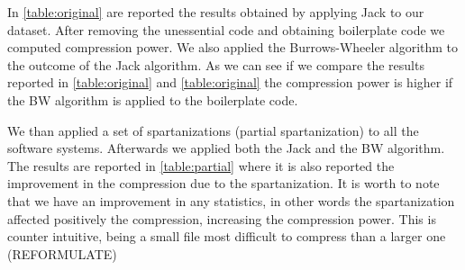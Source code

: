 In \cref{table:original} are reported the results obtained by applying Jack to
our dataset. After removing the unessential code and obtaining boilerplate
code we computed compression power. We also applied the Burrows-Wheeler
algorithm to the outcome of the Jack algorithm. As we can see if we compare
the results reported in \cref{table:original} and \cref{table:original} the
compression power is higher if the BW algorithm is applied to the boilerplate
code.

\begin{table}
  \label{table:original}
  \caption{The results of the compression using the Jack algorithm alone and both Jack and
  Burrows-Wheeler algorithms combined}
  \centering
\end{table}

We than applied a set of spartanizations (partial spartanization) to all the
software systems. Afterwards we applied both the Jack and the BW algorithm.
The results are reported in \cref{table:partial} where it is also
reported the improvement in the compression due to the spartanization. It is
worth to note that we have an improvement in any statistics, in other words the
spartanization affected positively the compression, increasing the compression
power. This is counter intuitive, being a small file most difficult to
compress than a larger one (REFORMULATE)


